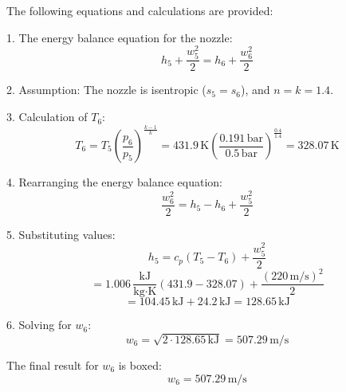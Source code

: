 The following equations and calculations are provided:  

1. The energy balance equation for the nozzle:  
   \[
   h_5 + \frac{w_5^2}{2} = h_6 + \frac{w_6^2}{2}
   \]

2. Assumption: The nozzle is isentropic (\( s_5 = s_6 \)), and \( n = k = 1.4 \).  

3. Calculation of \( T_6 \):  
   \[
   T_6 = T_5 \left( \frac{p_6}{p_5} \right)^{\frac{k-1}{k}} = 431.9 \, \text{K} \left( \frac{0.191 \, \text{bar}}{0.5 \, \text{bar}} \right)^{\frac{0.4}{1.4}} = 328.07 \, \text{K}
   \]

4. Rearranging the energy balance equation:  
   \[
   \frac{w_6^2}{2} = h_5 - h_6 + \frac{w_5^2}{2}
   \]

5. Substituting values:  
   \[
   h_5 = c_p (T_5 - T_6) + \frac{w_5^2}{2}
   \]
   \[
   = 1.006 \, \frac{\text{kJ}}{\text{kg·K}} (431.9 - 328.07) + \frac{(220 \, \text{m/s})^2}{2}
   \]
   \[
   = 104.45 \, \text{kJ} + 24.2 \, \text{kJ} = 128.65 \, \text{kJ}
   \]

6. Solving for \( w_6 \):  
   \[
   w_6 = \sqrt{2 \cdot 128.65 \, \text{kJ}} = 507.29 \, \text{m/s}
   \]  

The final result for \( w_6 \) is boxed:  
\[
w_6 = 507.29 \, \text{m/s}
\]